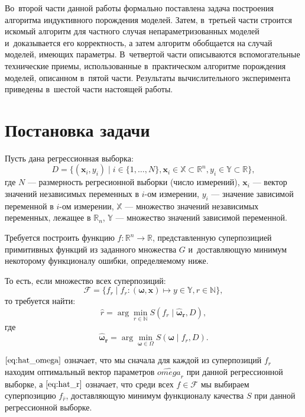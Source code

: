 \documentclass[12pt,a4paper]{amsart}
\begin{document}
Во~второй части данной работы формально поставлена задача построения алгоритма
индуктивного порождения моделей. Затем, в~третьей части строится искомый
алгоритм для частного случая непараметризованных моделей и~доказывается его
корректность, а затем алгоритм обобщается на случай моделей, имеющих параметры.
В~четвертой части описываются вспомогательные технические приемы, использованные
в~практическом алгоритме порождения моделей, описанном в~пятой части. Результаты
вычислительного эксперимента приведены в~шестой части настоящей работы.

\section{Постановка задачи}

Пусть дана регрессионная выборка:
\[
D = \{ (\mathbf{x}_i, y_i) \mid i \in \{1, \dots, N\},
			\mathbf{x}_i \in \mathbb{X} \subset \mathbb{R}^n,
			y_i \in \mathbb{Y} \subset \mathbb{R} \},
\]
где $N$ --- размерность регресионной выборки (число измерений), $\mathbf{x}_i$
--- вектор значений независимых переменных в $i$-ом измерении, $y_i$ ---
значение зависимой переменной в $i$-ом измерении, $\mathbb{X}$ --- множество
значений независимых переменных, лежащее в $\mathbb{R}_n$, $\mathbb{Y}$ ---
множество значений зависимой переменной.

Требуется построить функцию $f : \mathbb{R}^n \rightarrow \mathbb{R}$,
представленную суперпозицией примитивных функций из заданного множества $G$
и~доставляющую минимум некоторому функционалу ошибки, определяемому ниже.

То есть, если множество всех суперпозиций:
\[
\mathcal{F} = \{ f_r \mid
			f_r : (\boldsymbol{\omega}, \mathbf{x}) \mapsto y \in \mathbb{Y},
			r \in \mathbb{N} \},
\]
то требуется найти:
\begin{equation}
  \label{eq:hat_r}
  \hat{r} = \arg \min_{r \in \mathbb{N}} S (f_r \mid \boldsymbol{\hat{\omega}_r}, D),
\end{equation}
где
\begin{equation}
  \label{eq:hat_omega}
  \boldsymbol{\hat{\omega}_r} = \arg \min_{\boldsymbol{\omega} \in \Omega} S(\boldsymbol{\omega} \mid f_r, D).
\end{equation}

$\eqref{eq:hat_omega}$ означает, что мы сначала для каждой из суперпозиций
$f_r$ находим оптимальный вектор параметров $\hat{omega}_r$ при
данной регрессионной выборке, а $\eqref{eq:hat_r}$ означает,
что среди всех $f \in \mathcal{F}$ мы выбираем суперпозицию $f_{\hat{r}}$,
доставляющую минимум функционалу качества $S$ при данной регрессионной
выборке.
\end{document}
